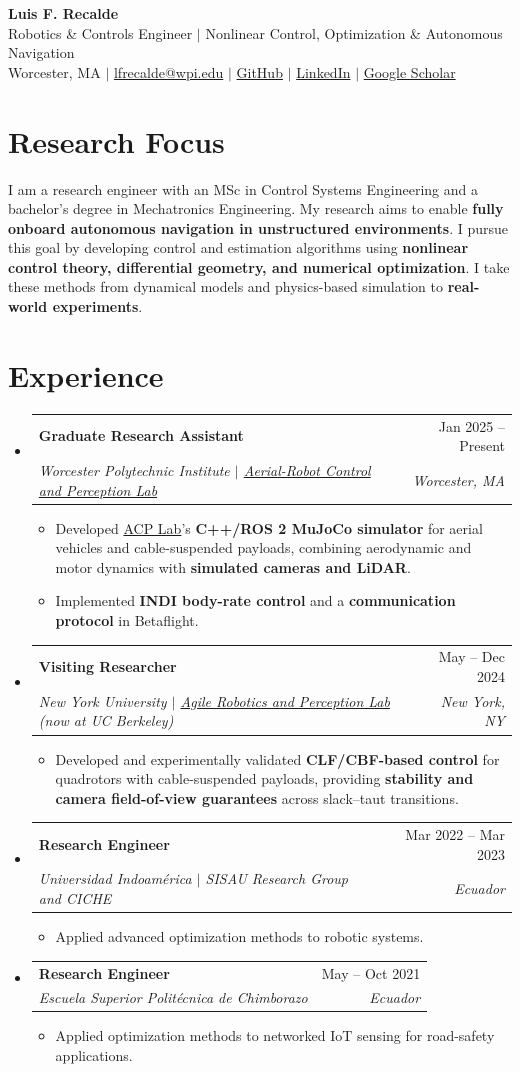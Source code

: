 \documentclass[letterpaper,11pt]{article}
\makeatletter
\newcommand{\resumeItem}[1]{
  \item {\small #1\par}\vspace{-2pt}
}
\newcommand{\resumeSubheading}[4]{
  \vspace{-2pt}\item
    \begin{tabular*}{0.97\textwidth}[t]{l@{\extracolsep{\fill}}r}
      \textbf{#1} & #2 \\
      \textit{\small#3} & \textit{\small #4} \\
    \end{tabular*}\vspace{-7pt}
}
\newcommand{\resumeSubHeadingListStart}{\begin{itemize}[leftmargin=0.15in, label={}]}
\newcommand{\resumeSubHeadingListEnd}{\end{itemize}}
\newcommand{\resumeItemListStart}{\begin{itemize}}
\newcommand{\resumeItemListEnd}{\end{itemize}\vspace{-5pt}}
\makeatother
\begin{document}
\begin{center}
\textcolor{HeadingNavy}{\textbf{\Huge Luis F. Recalde}} \\ \vspace{3pt}
\small Robotics \& Controls Engineer $|$ Nonlinear Control, Optimization \& Autonomous Navigation \\ \vspace{3pt}
Worcester, MA $|$ \href{mailto:lfrecalde@wpi.edu}{lfrecalde@wpi.edu} $|$
\href{https://github.com/lfrecalde1}{GitHub} $|$
\href{https://www.linkedin.com/in/luis-f-recalde-8a6432123}{LinkedIn} $|$
\href{https://scholar.google.com/citations?user=_v1511cAAAAJ}{Google Scholar}
\end{center}
\vspace{-12pt}
\section{Research Focus}
{\small I am a research engineer with an MSc in Control Systems Engineering and a bachelor's degree in Mechatronics Engineering.
My research aims to enable \textbf{fully onboard autonomous navigation in unstructured environments}.
I pursue this goal by developing control and estimation algorithms using \textbf{nonlinear control theory, differential geometry, and numerical optimization}.
I take these methods from dynamical models and physics-based simulation to \textbf{real-world experiments}.\par}
\section{Experience}
\resumeSubHeadingListStart
\resumeSubheading{Graduate Research Assistant}{Jan 2025 -- Present}
{Worcester Polytechnic Institute $|$ \href{https://acp-lab.github.io/acplab-web/}{Aerial-Robot Control and Perception Lab}}{Worcester, MA}
\resumeItemListStart
\resumeItem{Developed \href{https://acp-lab.github.io/acplab-web/}{ACP Lab}'s \textbf{C++/ROS 2 MuJoCo simulator} for aerial vehicles and cable-suspended payloads, combining aerodynamic and motor dynamics with \textbf{simulated cameras and LiDAR}.}
\resumeItem{Implemented \textbf{INDI body-rate control} and a \textbf{communication protocol} in Betaflight.}
\resumeItemListEnd
\resumeSubheading{Visiting Researcher}{May -- Dec 2024}
{New York University $|$ \href{https://arplaboratory.github.io/}{Agile Robotics and Perception Lab} (now at UC Berkeley)}{New York, NY}
\resumeItemListStart
\resumeItem{Developed and experimentally validated \textbf{CLF/CBF-based control} for quadrotors with cable-suspended payloads, providing \textbf{stability and camera field-of-view guarantees} across slack--taut transitions.}
\resumeItemListEnd
\resumeSubheading{Research Engineer}{Mar 2022 -- Mar 2023}
{Universidad Indoam\'erica $|$ SISAU Research Group and CICHE}{Ecuador}
\resumeItemListStart
\resumeItem{Applied advanced optimization methods to robotic systems.}
\resumeItemListEnd
\resumeSubheading{Research Engineer}{May -- Oct 2021}
{Escuela Superior Polit\'ecnica de Chimborazo}{Ecuador}
\resumeItemListStart
\resumeItem{Applied optimization methods to networked IoT sensing for road-safety applications.}
\resumeItemListEnd
\resumeSubHeadingListEnd
\end{document}
